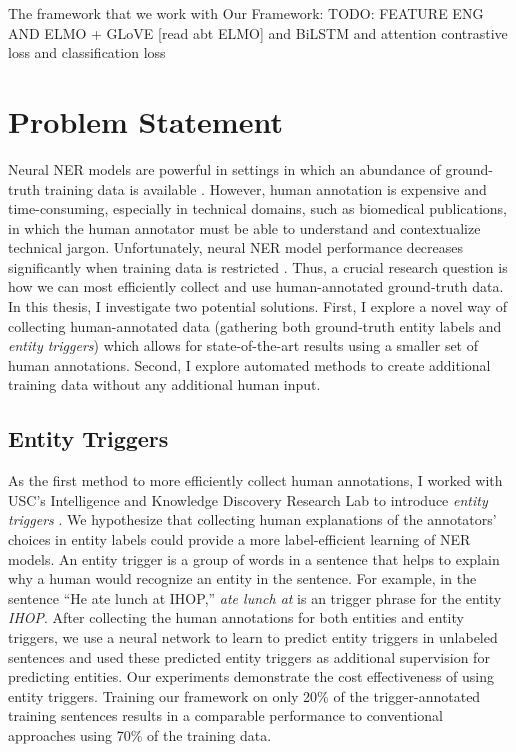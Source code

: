 The framework that we work with
Our Framework:
TODO: FEATURE ENG AND ELMO + GLoVE [read abt ELMO] and BiLSTM and attention contrastive loss and classification loss

\section{Problem Statement}
Neural NER models are powerful in settings in which an abundance of ground-truth training data is available \cite{LampleNER}. However, human annotation is expensive and time-consuming, especially in technical domains, such as biomedical publications, in which the human annotator must be able to understand and contextualize technical jargon. Unfortunately, neural NER model performance decreases significantly when training data is restricted \cite{TriggerNER}. Thus, a crucial research question is how we can most efficiently collect and use human-annotated ground-truth data. In this thesis, I investigate two potential solutions. First, I explore a novel way of collecting human-annotated data (gathering both ground-truth entity labels and \textit{entity triggers}) which allows for state-of-the-art results using a smaller set of human annotations. Second, I explore automated methods to create additional training data without any additional human input.

\subsection{Entity Triggers}
As the first method to more efficiently collect human annotations, I worked with USC's Intelligence and Knowledge Discovery Research Lab to introduce \textit{entity triggers} \cite{TriggerNER}. We hypothesize that collecting human explanations of the annotators' choices in entity labels could provide a more label-efficient learning of NER models. An entity trigger is a group of words in a sentence that helps to explain why a human would recognize an entity in the sentence. For example, in the sentence ``He ate lunch at IHOP,'' \textit{ate lunch at} is an trigger phrase for the entity \textit{IHOP}. After collecting the human annotations for both entities and entity triggers, we use a neural network to learn to predict entity triggers in unlabeled sentences and used these predicted entity triggers as additional supervision for predicting entities. Our experiments demonstrate the cost effectiveness of using entity triggers. Training our framework on only 20\% of the trigger-annotated training sentences results in a comparable performance to conventional approaches using 70\% of the training data.

